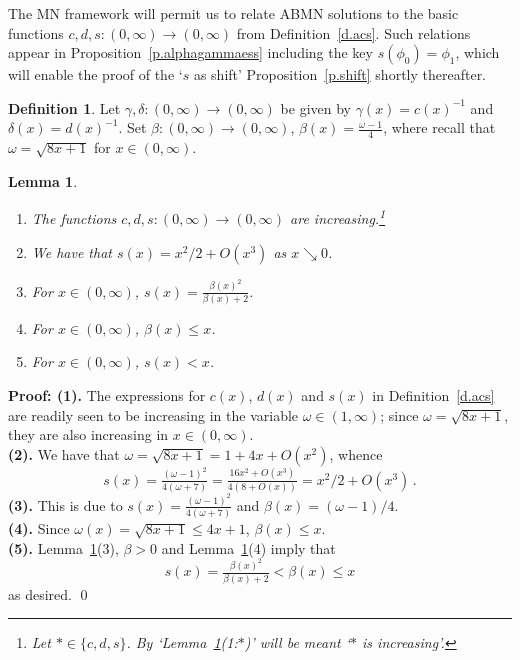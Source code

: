 \documentclass[letterpaper,11pt,oneside,reqno]{amsbook}
\numberwithin{figure}{chapter}
\newtheorem{lemma}[theorem]{Lemma}
\theoremstyle{definition}
\theoremstyle{definition}
\theoremstyle{definition}
\newtheorem{definition}[theorem]{Definition}
\theoremstyle{definition}
\theoremstyle{definition}
\newcommand{\macsee}{c}
\newcommand{\macbeta}{\beta}
\newcommand{\macomega}{\omega}
\newcommand{\macdee}{d}
\newcommand{\macgsee}{\gamma}
\newcommand{\macgdee}{\delta}
\newcommand{\abmnmacspace}{\textrm{ABMN} }
\newcommand{\mnmacspace}{\textrm{MN} }
\def\hfff#1{\label{#1}}
\begin{document}
  The \mnmacspace framework will permit us to relate \abmnmacspace solutions to the basic functions $\macsee,\macdee,s:(0,\infty) \to (0,\infty)$ from Definition~\ref{d.acs}. 
  Such relations appear in Proposition~\ref{p.alphagammaess} including the key $s(\phi_0)=\phi_1$, which will enable the proof of the `$s$ as shift' Proposition~\ref{p.shift} shortly thereafter. 
    \begin{definition}\label{d.alphagamma}\hfff{alphagamma}
  Let $\macgsee,\macgdee:(0,\infty) \to (0,\infty)$ be given by $\macgsee(x) = \macsee(x)^{-1}$ and $\macgdee(x) = \macdee(x)^{-1}$.
  Set $\macbeta:(0,\infty) \to (0,\infty)$, $\macbeta(x) = \tfrac{\macomega - 1}{4}$, where recall that $\macomega = \sqrt{8x+1}$ for $x \in (0,\infty)$.
  \end{definition}
  
\begin{lemma}\label{l.acsfacts}
\leavevmode
\begin{enumerate}
\item The functions $\macsee,\macdee,s:(0,\infty) \to (0,\infty)$ are increasing.\footnote{Let $* \in \{ c,d,s \}$. By `Lemma~\ref{l.acsfacts}(1:$*$)' will be meant `$*$ is increasing'.}
\item
We have that $s(x) = x^2/2 + O(x^3)$ as $x \searrow 0$.
\item
For $x \in (0,\infty)$, $s(x) = \tfrac{\macbeta(x)^2}{\macbeta(x)+2}$. 
\item  
For $x \in (0,\infty)$, $\macbeta(x) \leq x$.
\item 
For $x \in (0,\infty)$, $s(x) < x$.
\end{enumerate}
\end{lemma}
{\bf Proof: (1).} 
The expressions for $\macsee(x)$, $\macdee(x)$ and $s(x)$ in Definition~\ref{d.acs} are readily seen to be increasing in the variable $\macomega \in (1,\infty)$; since $\macomega = \sqrt{8x +1}$, they are also increasing in $x \in (0,\infty)$.\\
{\bf (2).} We have that $\macomega = \sqrt{8x +1} = 1 + 4x + O(x^2)$, whence 
$$
s(x) = \tfrac{(\omega-1)^2}{4(\omega +7)}= \tfrac{16 x^2 + O(x^3)}{4(8 + O(x))} = x^2/2 + O(x^3)\, . 
$$
{\bf (3).}  This is due to $s(x) = \tfrac{(\macomega-1)^2}{4(\macomega+7)}$ and $\macbeta(x) = (\macomega-1)/4$. \\
{\bf (4).} 
Since $\macomega(x) = \sqrt{8x +1} \leq 4x+1$, $\macbeta(x) \leq x$.  \\
{\bf (5).}
Lemma~\ref{l.acsfacts}(3), $\macbeta > 0$ and Lemma~\ref{l.acsfacts}(4) imply that 
 $$
 s(x) = \tfrac{\macbeta(x)^2}{\macbeta(x) + 2} < \macbeta(x) \leq x
 $$
as desired.
\qed
\end{document}
